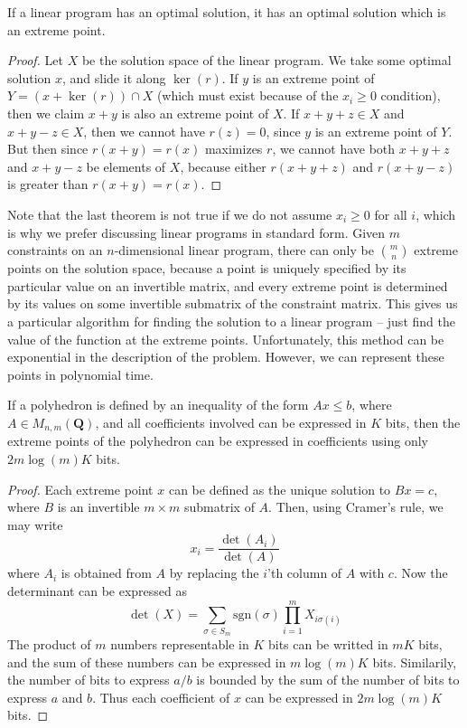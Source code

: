     \begin{lemma}
        If a linear program has an optimal solution, it has an optimal solution which is an extreme point.
    \end{lemma}
    \begin{proof}
        Let $X$ be the solution space of the linear program. We take some optimal solution $x$, and slide it along $\ker(r)$. If $y$ is an extreme point of $Y = (x + \ker(r)) \cap X$ (which must exist because of the $x_i \geq 0$ condition), then we claim $x + y$ is also an extreme point of $X$. If $x + y + z \in X$ and $x + y - z \in X$, then we cannot have $r(z) = 0$, since $y$ is an extreme point of $Y$. But then since $r(x + y) = r(x)$ maximizes $r$, we cannot have both $x + y + z$ and $x + y - z$ be elements of $X$, because either $r(x + y + z)$ and $r(x + y - z)$ is greater than $r(x + y) = r(x)$.
    \end{proof}

    Note that the last theorem is not true if we do not assume $x_i \geq 0$ for all $i$, which is why we prefer discussing linear programs in standard form. Given $m$ constraints on an $n$-dimensional linear program, there can only be ${m \choose n}$ extreme points on the solution space, because a point is uniquely specified by its particular value on an invertible matrix, and every extreme point is determined by its values on some invertible submatrix of the constraint matrix. This gives us a particular algorithm for finding the solution to a linear program -- just find the value of the function at the extreme points. Unfortunately, this method can be exponential in the description of the problem. However, we can represent these points in polynomial time.

    \begin{theorem}
        If a polyhedron is defined by an inequality of the form $Ax \leq b$, where $A \in M_{n,m}(\mathbf{Q})$, and all coefficients involved can be expressed in $K$ bits, then the extreme points of the polyhedron can be expressed in coefficients using only $2m \log(m) K$ bits.
    \end{theorem}
    \begin{proof}
        Each extreme point $x$ can be defined as the unique solution to $Bx = c$, where $B$ is an invertible $m \times m$ submatrix of $A$. Then, using Cramer's rule, we may write
        \[ x_i = \frac{\det(A_i)}{\det(A)} \]
        where $A_i$ is obtained from $A$ by replacing the $i$'th column of $A$ with $c$. Now the determinant can be expressed as
        \[ \det(X) = \sum_{\sigma \in S_m} \text{sgn}(\sigma) \prod_{i = 1}^m X_{i \sigma(i)} \]
        The product of $m$ numbers representable in $K$ bits can be writted in $mK$ bits, and the sum of these numbers can be expressed in $m \log(m) K$ bits. Similarily, the number of bits to express $a/b$ is bounded by the sum of the number of bits to express $a$ and $b$. Thus each coefficient of $x$ can be expressed in $2m \log(m) K$ bits.
    \end{proof}

